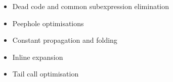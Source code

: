 \documentclass[12pt]{article}
\begin{document}
\begin{itemize}
\item Dead code and common subexpression elimination %

\item Peephole optimisations

\item Constant propagation and folding

\item Inline expansion

\item Tail call optimisation








\end{itemize}
\end{document}
